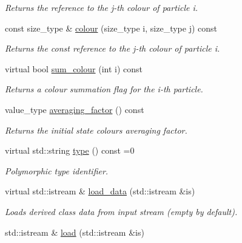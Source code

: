 \begin{DoxyCompactItemize}
\begin{DoxyCompactList}\small\item\em Returns the reference to the j-\/th colour of particle i. \end{DoxyCompactList}\item 
\hypertarget{a00083_af0e69b425bcd4c7c12a598e33671f672}{const size\-\_\-type \& \hyperlink{a00083_af0e69b425bcd4c7c12a598e33671f672}{colour} (size\-\_\-type i, size\-\_\-type j) const }\label{a00083_af0e69b425bcd4c7c12a598e33671f672}

\begin{DoxyCompactList}\small\item\em Returns the const reference to the j-\/th colour of particle i. \end{DoxyCompactList}\item 
virtual bool \hyperlink{a00083_ab7feac6ce81715acc83ac60b3d992129}{sum\-\_\-colour} (int i) const 
\begin{DoxyCompactList}\small\item\em Returns a colour summation flag for the i-\/th particle. \end{DoxyCompactList}\item 
\hypertarget{a00083_abf3501b50281c654cf52691b1123acd9}{value\-\_\-type \hyperlink{a00083_abf3501b50281c654cf52691b1123acd9}{averaging\-\_\-factor} () const }\label{a00083_abf3501b50281c654cf52691b1123acd9}

\begin{DoxyCompactList}\small\item\em Returns the initial state colours averaging factor. \end{DoxyCompactList}\item 
\hypertarget{a00083_a67ebadae11c823e70d4ff32cbe582051}{virtual std\-::string \hyperlink{a00083_a67ebadae11c823e70d4ff32cbe582051}{type} () const =0}\label{a00083_a67ebadae11c823e70d4ff32cbe582051}

\begin{DoxyCompactList}\small\item\em Polymorphic type identifier. \end{DoxyCompactList}\item 
\hypertarget{a00083_a550a3fde022600fdec724b66423b1e63}{virtual std\-::istream \& \hyperlink{a00083_a550a3fde022600fdec724b66423b1e63}{load\-\_\-data} (std\-::istream \&is)}\label{a00083_a550a3fde022600fdec724b66423b1e63}

\begin{DoxyCompactList}\small\item\em Loads derived class data from input stream (empty by default). \end{DoxyCompactList}\item 
\hypertarget{a00083_a6d96f236f6741357d9c45bcb3924503a}{std\-::istream \& \hyperlink{a00083_a6d96f236f6741357d9c45bcb3924503a}{load} (std\-::istream \&is)}\label{a00083_a6d96f236f6741357d9c45bcb3924503a}


\end{DoxyCompactItemize}
